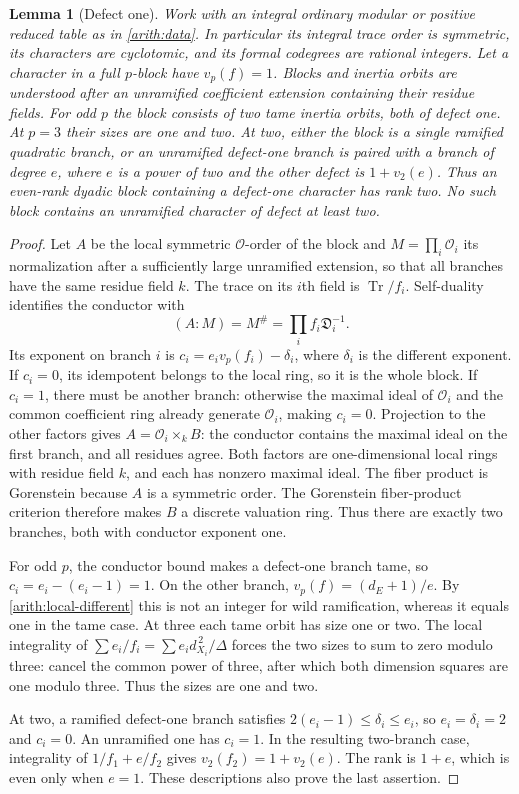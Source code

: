 \documentclass[11pt,a4paper]{article}
\numberwithin{equation}{section}
\newtheorem{lemma}[theorem]{Lemma}
\begin{document}
\begin{lemma}[Defect one]\label{arith:defect-one}
Work with an integral ordinary modular or positive reduced table
as in \eqref{arith:data}. In particular its integral trace order is
symmetric, its characters are cyclotomic, and its formal codegrees
are rational integers. Let a character in a full $p$-block have
$v_p(f)=1$. Blocks and inertia orbits are understood after an
unramified coefficient extension containing their residue fields.
For odd $p$ the block consists of two tame inertia orbits, both of
defect one. At $p=3$ their sizes are one and two.
At two, either the block is a single ramified quadratic branch,
or an unramified defect-one branch is paired with a branch of
degree $e$, where $e$ is a power of two and the other defect is
$1+v_2(e)$. Thus an even-rank dyadic block containing a
defect-one character has rank two.
No such block contains an unramified character of defect at least two.
\end{lemma}
\begin{proof}
Let $A$ be the local symmetric $\mathcal O$-order of the block and
$M=\prod_i\mathcal O_i$ its normalization after a sufficiently large
unramified extension, so that all branches have the same residue
field $k$. The trace on its $i$th field is $\operatorname{Tr}/f_i$.
Self-duality identifies the conductor with
\[
                (A:M)=M^\#=\prod_i f_i\mathfrak D_i^{-1}.
\]
Its exponent on branch $i$ is $c_i=e_iv_p(f_i)-\delta_i$,
where $\delta_i$ is the different exponent.
If $c_i=0$, its idempotent belongs to the local ring, so it is
the whole block. If $c_i=1$, there must be another branch: otherwise
the maximal ideal of $\mathcal O_i$ and the common coefficient ring
already generate $\mathcal O_i$, making $c_i=0$. Projection to the
other factors gives $A=\mathcal O_i\times_k B$: the conductor contains the
maximal ideal on the first branch, and all residues agree.
Both factors are one-dimensional local rings with residue field $k$,
and each has nonzero maximal ideal. The fiber product is Gorenstein
because $A$ is a symmetric order. The Gorenstein fiber-product criterion
\cite[Corollary~2.7]{NSTV} therefore makes $B$ a discrete valuation
ring. Thus there are exactly two branches, both with conductor exponent one.

For odd $p$, the conductor bound makes a defect-one branch tame,
so $c_i=e_i-(e_i-1)=1$. On the other branch,
$v_p(f)=(d_E+1)/e$. By \eqref{arith:local-different} this is not
an integer for wild ramification, whereas it equals one in the
tame case. At three each tame orbit has size one or two.
The local integrality of $\sum e_i/f_i=\sum e_i d_{X_i}^{\,2}/\Delta$
forces the two sizes to sum to zero modulo three: cancel the common
power of three, after which both dimension squares are one modulo
three. Thus the sizes are one and two.

At two, a ramified defect-one branch satisfies
$2(e_i-1)\le\delta_i\le e_i$, so $e_i=\delta_i=2$ and $c_i=0$.
An unramified one has $c_i=1$. In the resulting two-branch case,
integrality of $1/f_1+e/f_2$ gives $v_2(f_2)=1+v_2(e)$.
The rank is $1+e$, which is even only when $e=1$.
These descriptions also prove the last assertion.
\end{proof}
\end{document}
